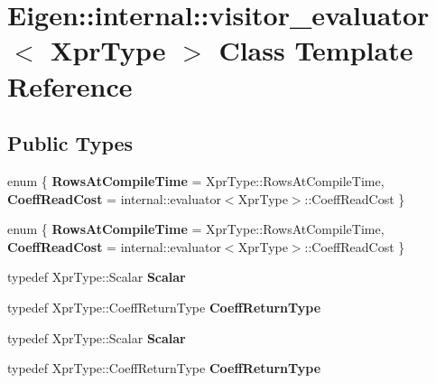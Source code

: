 \hypertarget{class_eigen_1_1internal_1_1visitor__evaluator}{}\section{Eigen\+:\+:internal\+:\+:visitor\+\_\+evaluator$<$ Xpr\+Type $>$ Class Template Reference}
\label{class_eigen_1_1internal_1_1visitor__evaluator}
\subsection*{Public Types}
\begin{DoxyCompactItemize}
\item 
\mbox{\label{class_eigen_1_1internal_1_1visitor__evaluator_aab7b93650fec5fd1d5cfe3a083f48c3e}} 
enum \{ {\bfseries Rows\+At\+Compile\+Time} = Xpr\+Type\+:\+:Rows\+At\+Compile\+Time, 
{\bfseries Coeff\+Read\+Cost} = internal\+:\+:evaluator$<$Xpr\+Type$>$\+:\+:Coeff\+Read\+Cost
 \}
\item 
\mbox{\label{class_eigen_1_1internal_1_1visitor__evaluator_a2a1f0ab0e72ae94f4f720ee38ed7fa4d}} 
enum \{ {\bfseries Rows\+At\+Compile\+Time} = Xpr\+Type\+:\+:Rows\+At\+Compile\+Time, 
{\bfseries Coeff\+Read\+Cost} = internal\+:\+:evaluator$<$Xpr\+Type$>$\+:\+:Coeff\+Read\+Cost
 \}
\item 
\mbox{\label{class_eigen_1_1internal_1_1visitor__evaluator_a338f2c6066ef18790ed4c56e9c34fada}} 
typedef Xpr\+Type\+::\+Scalar {\bfseries Scalar}
\item 
\mbox{\label{class_eigen_1_1internal_1_1visitor__evaluator_aefc76b27156b43a28b3075d81a33d4fb}} 
typedef Xpr\+Type\+::\+Coeff\+Return\+Type {\bfseries Coeff\+Return\+Type}
\item 
\mbox{\label{class_eigen_1_1internal_1_1visitor__evaluator_a338f2c6066ef18790ed4c56e9c34fada}} 
typedef Xpr\+Type\+::\+Scalar {\bfseries Scalar}
\item 
\mbox{\label{class_eigen_1_1internal_1_1visitor__evaluator_aefc76b27156b43a28b3075d81a33d4fb}} 
typedef Xpr\+Type\+::\+Coeff\+Return\+Type {\bfseries Coeff\+Return\+Type}
\end{DoxyCompactItemize}
